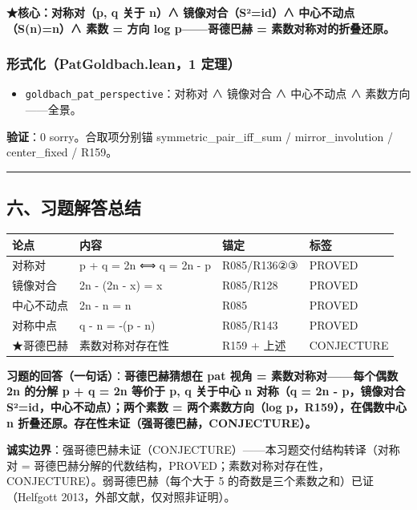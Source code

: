 \documentclass[
]{article}
\newcounter{none} %
\providecommand{\tightlist}{%
 \setlength{\itemsep}{0pt}\setlength{\parskip}{0pt}}
\begin{document}
\textbf{★核心：对称对（p, q 关于 n）∧ 镜像对合（S²=id）∧
中心不动点（S(n)=n）∧ 素数 = 方向 log p------哥德巴赫 =
素数对称对的折叠还原。}

\subsubsection{形式化（PatGoldbach.lean，1
定理）}\label{ux5f62ux5f0fux5316patgoldbach.lean1-ux5b9aux7406-3}

\begin{itemize}
\tightlist
\item
 \texttt{goldbach\_pat\_perspective}：对称对 ∧ 镜像对合 ∧ 中心不动点 ∧
 素数方向------全景。
\end{itemize}

\textbf{验证}：0 sorry。合取项分别锚 symmetric\_pair\_iff\_sum /
mirror\_involution / center\_fixed / R159。

\begin{center}\rule{0.5\linewidth}{0.5pt}\end{center}

\subsection{六、习题解答总结}\label{ux516dux4e60ux9898ux89e3ux7b54ux603bux7ed3}

{\def\LTcaptype{none} %
\begin{longtable}[]{@{}llll@{}}
\toprule\noalign{}
论点 & 内容 & 锚定 & 标签 \\
\midrule\noalign{}
\endhead
\bottomrule\noalign{}
\endlastfoot
对称对 & p + q = 2n ⟺ q = 2n - p & R085/R136②③ & PROVED \\
镜像对合 & 2n - (2n - x) = x & R085/R128 & PROVED \\
中心不动点 & 2n - n = n & R085 & PROVED \\
对称中点 & q - n = -(p - n) & R085/R143 & PROVED \\
★哥德巴赫 & 素数对称对存在性 & R159 + 上述 & CONJECTURE \\
\end{longtable}
}

\textbf{习题的回答（一句话）}：\textbf{哥德巴赫猜想在 pat 视角 =
素数对称对------每个偶数 2n 的分解 p + q = 2n 等价于 p, q 关于中心 n
对称（q = 2n - p，镜像对合 S²=id，中心不动点）；两个素数 =
两个素数方向（log p，R159），在偶数中心 n
折叠还原。存在性未证（强哥德巴赫，CONJECTURE）。}

\textbf{诚实边界}：强哥德巴赫未证（CONJECTURE）------本习题交付结构转译（对称对
=
哥德巴赫分解的代数结构，PROVED；素数对称对存在性，CONJECTURE）。弱哥德巴赫（每个大于
5 的奇数是三个素数之和）已证（Helfgott 2013，外部文献，仅对照非证明）。
\end{document}
